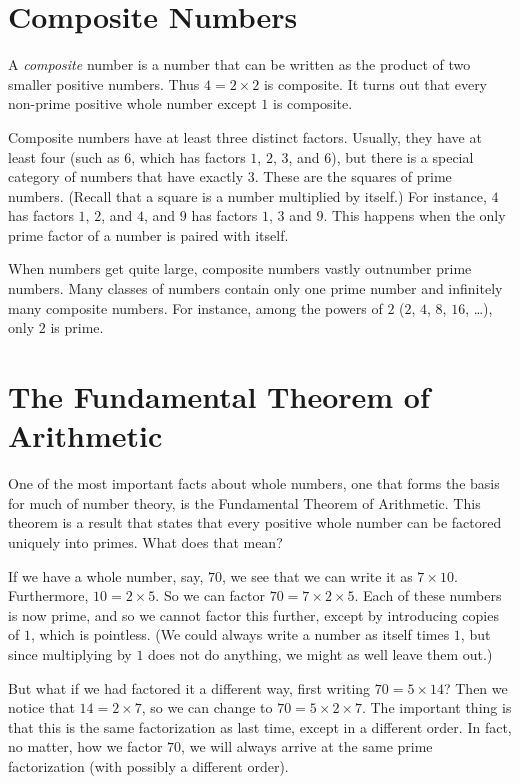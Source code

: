 \documentclass[a4paper,10pt]{report}
\begin{document}
\section{Composite Numbers}

A \emph{composite} number is a number that can be written as the product of two
smaller positive numbers. Thus \(4=2\times2\) is composite. It turns out that
every non-prime positive whole number except \(1\) is composite.

Composite numbers have at least three distinct factors. Usually, they have at
least four (such as \(6\), which has factors \(1\), \(2\), \(3\), and \(6\)),
but there is a special category of numbers that have exactly \(3\). These are
the squares of prime numbers. (Recall that a square is a number multiplied by
itself.) For instance, \(4\) has factors \(1\), \(2\), and \(4\), and \(9\) has
factors \(1\), \(3\) and \(9\). This happens when the only prime factor of a
number is paired with itself.

When numbers get quite large, composite numbers vastly outnumber prime numbers.
Many classes of numbers contain only one prime number and infinitely many
composite numbers. For instance, among the powers of \(2\) (\(2\), \(4\),
\(8\), \(16\), \dots), only \(2\) is prime.

\section{The Fundamental Theorem of Arithmetic}

One of the most important facts about whole numbers, one that forms the basis
for much of number theory, is the Fundamental Theorem of Arithmetic. This
theorem is a result that states that every positive whole number can be
factored uniquely into primes. What does that mean?

If we have a whole number, say, \(70\), we see that we can write it as
\(7\times10\). Furthermore, \(10=2\times5\). So we can factor
\(70=7\times2\times5\). Each of these numbers is now prime, and so we cannot
factor this further, except by introducing copies of \(1\), which is pointless.
(We could always write a number as itself times \(1\), but since multiplying by
\(1\) does not do anything, we might as well leave them out.)

But what if we had factored it a different way, first writing \(70=5\times14\)?
Then we notice that \(14=2\times7\), so we can change to
\(70=5\times2\times7\). The important thing is that this is the same
factorization as last time, except in a different order. In fact, no matter,
how we factor \(70\), we will always arrive at the same prime factorization
(with possibly a different order).
\end{document}
